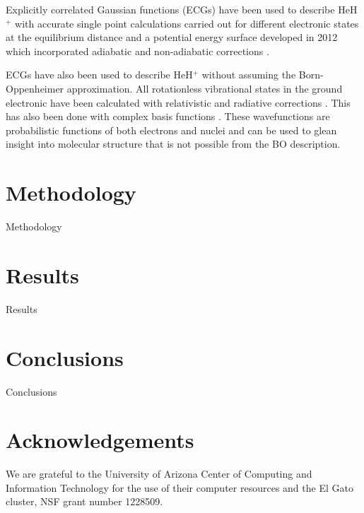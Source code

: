 \documentclass[aps,onecolumn]{revtex4}
\begin{document}
Explicitly correlated Gaussian functions (ECGs) have been used to describe HeH$^+$ with accurate
single point calculations carried out for different electronic states \cite{ECG_HeH+} at
the equilibrium distance and a potential energy surface developed in 2012 which incorporated
adiabatic and non-adiabatic corrections \cite{HeH+_Wei2012}.

ECGs have also been used to describe HeH$^+$ without assuming the Born-Oppenheimer approximation.
All rotationless vibrational states in the ground electronic have been calculated \cite{Theory3}
with relativistic and radiative corrections \cite{Theory4, Theory2}. This has also been done
with complex basis functions \cite{Theory1}. These wavefunctions are probabilistic functions
of both electrons and nuclei and can be used to glean insight into molecular structure that is
not possible from the BO description.


\section{Methodology}
\label{MTD}
Methodology

\section{Results}
\label{Results}
Results

\section{Conclusions}
Conclusions

\section{Acknowledgements}
We are grateful to the University of Arizona Center of Computing and Information Technology
for the use of their computer resources and the El Gato cluster, NSF grant number 1228509.

\newpage



\newpage
\end{document}
